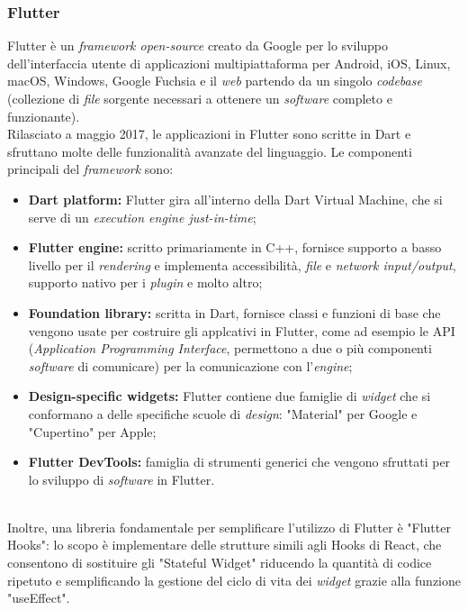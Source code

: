 \subsubsection{Flutter}
Flutter è un \textit{framework open-source} creato da Google per lo sviluppo dell'interfaccia utente di applicazioni multipiattaforma per Android, iOS, Linux, macOS, Windows, Google Fuchsia e il \textit{web} partendo da un singolo \textit{codebase} (collezione di \textit{file} sorgente necessari a ottenere un \textit{software} completo e funzionante).\\
Rilasciato a maggio 2017, le applicazioni in Flutter sono scritte in Dart e sfruttano molte delle funzionalità avanzate del linguaggio. Le componenti principali del \textit{framework} sono:
\begin{itemize}
    \item \textbf{Dart platform:} Flutter gira all'interno della Dart Virtual Machine, che si serve di un \textit{execution engine just-in-time};
    \item \textbf{Flutter engine:} scritto primariamente in C++, fornisce supporto a basso livello per il \textit{rendering} e implementa accessibilità, \textit{file} e \textit{network input/output}, supporto nativo per i \textit{plugin} e molto altro;
    \item \textbf{Foundation library:} scritta in Dart, fornisce classi e funzioni di base che vengono usate per costruire gli applcativi in Flutter, come ad esempio le API (\textit{Application Programming Interface}, permettono a due o più componenti \textit{software} di comunicare) per la comunicazione con l'\textit{engine};
    \item \textbf{Design-specific widgets:} Flutter contiene due famiglie di \textit{widget} che si conformano a delle specifiche scuole di \textit{design}: "Material" per Google e "Cupertino" per Apple;
    \item \textbf{Flutter DevTools:} famiglia di strumenti generici che vengono sfruttati per lo sviluppo di \textit{software} in Flutter.
\end{itemize}
~\\
Inoltre, una libreria fondamentale per semplificare l'utilizzo di Flutter è "Flutter Hooks": lo scopo è implementare delle strutture simili agli Hooks di React, che consentono di sostituire gli "Stateful Widget" riducendo la quantità di codice ripetuto e semplificando la gestione del ciclo di vita dei \textit{widget} grazie alla funzione "useEffect".

